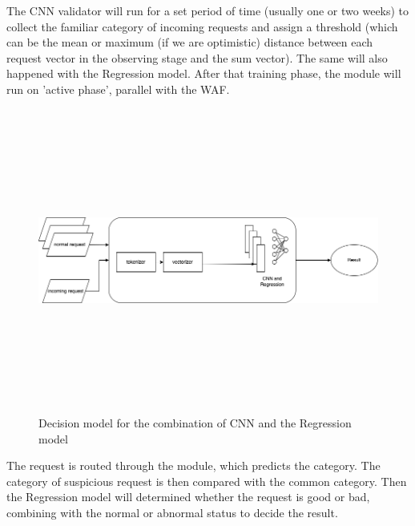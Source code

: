 The CNN validator will run for a set period of time (usually one or two weeks) to collect the familiar category of incoming requests and assign a threshold (which can be the mean or maximum (if we are optimistic) distance between each request vector in the observing stage and the sum vector). The same will also happened with the Regression model. After that training phase, the module will run on 'active phase', parallel with the WAF. 

\begin{figure}[!h]
     \centering
     \includegraphics[width=\linewidth, height=10cm,keepaspectratio]{figures/architecture 2.drawio.png}
   \caption{Decision model for the combination of CNN and the Regression model}
\end{figure}

The request is routed through the module, which predicts the category. The category of suspicious request is then compared with the common category. Then the Regression model will determined whether the request is good or bad, combining with the normal or abnormal status to decide the result. 
